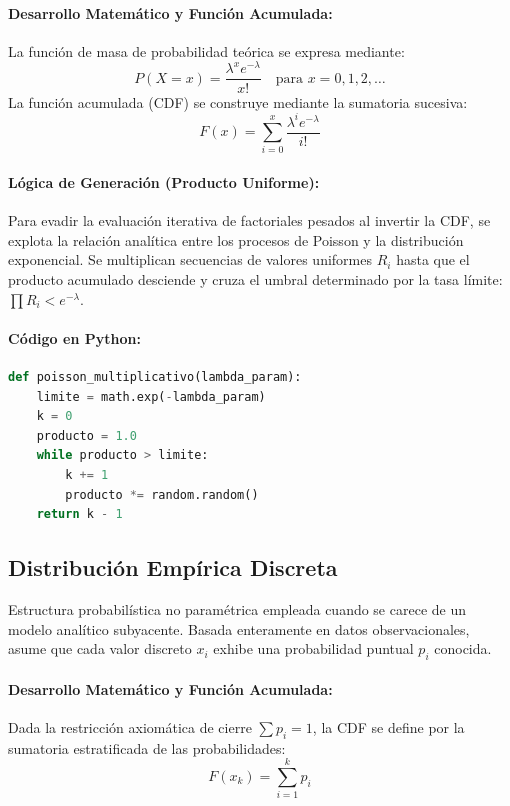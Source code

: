 \documentclass{article}
\begin{document}
\paragraph{Desarrollo Matemático y Función Acumulada:}
La función de masa de probabilidad teórica se expresa mediante:
\begin{equation}
P(X = x) = \frac{\lambda^x e^{-\lambda}}{x!} \quad \text{para } x = 0, 1, 2, \dots
\end{equation}
La función acumulada (CDF) se construye mediante la sumatoria sucesiva:
\begin{equation}
F(x) = \sum_{i=0}^{x} \frac{\lambda^i e^{-\lambda}}{i!}
\end{equation}

\paragraph{Lógica de Generación (Producto Uniforme):}
Para evadir la evaluación iterativa de factoriales pesados al invertir la CDF, se explota la relación analítica entre los procesos de Poisson y la distribución exponencial. Se multiplican secuencias de valores uniformes $R_i$ hasta que el producto acumulado desciende y cruza el umbral determinado por la tasa límite: $\prod R_i < e^{-\lambda}$.

\paragraph{Código en Python:}
\begin{lstlisting}[language=Python, caption=Generador de Poisson por producto de uniformes.]
def poisson_multiplicativo(lambda_param):
    limite = math.exp(-lambda_param)
    k = 0
    producto = 1.0
    while producto > limite:
        k += 1
        producto *= random.random()
    return k - 1
\end{lstlisting}

\subsection{Distribución Empírica Discreta}
Estructura probabilística no paramétrica empleada cuando se carece de un modelo analítico subyacente. Basada enteramente en datos observacionales, asume que cada valor discreto $x_i$ exhibe una probabilidad puntual $p_i$ conocida.

\paragraph{Desarrollo Matemático y Función Acumulada:}
Dada la restricción axiomática de cierre $\sum p_i = 1$, la CDF se define por la sumatoria estratificada de las probabilidades:
\begin{equation}
F(x_k) = \sum_{i=1}^{k} p_i
\end{equation}
\end{document}

